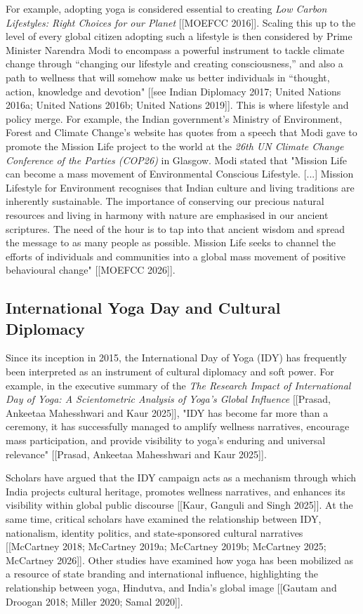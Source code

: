 \documentclass[11pt]{article}
\begin{document}
For example, adopting yoga is considered essential to creating \textit{Low Carbon Lifestyles: Right Choices for our Planet} [[MOEFCC 2016]].
Scaling this up to the level of every global citizen adopting such a lifestyle is then considered by Prime Minister Narendra Modi to encompass a powerful instrument to
tackle climate change through “changing our lifestyle and creating consciousness,” and also a path to wellness that will
somehow make us better individuals in “thought, action, knowledge and devotion" [[see Indian Diplomacy 2017; United Nations 2016a; United Nations 2016b; United Nations 2019]].
This is where lifestyle and policy merge. For example, the Indian government's Ministry of Environment, Forest and Climate Change's 
website has quotes from a speech that Modi gave to promote the Mission Life project to the world at the \textit{26th UN Climate Change 
Conference of the Parties (COP26)} in Glasgow. Modi stated that "Mission Life can become a mass movement of Environmental Conscious Lifestyle.
 [...] Mission Lifestyle for Environment recognises that Indian culture and living traditions are inherently sustainable.
The importance of conserving our precious natural resources and living in harmony with nature are emphasised in our ancient scriptures.
The need of the hour is to tap into that ancient wisdom and spread the message to as many people as possible. Mission Life 
seeks to channel the efforts of individuals and communities into a global mass movement of positive behavioural change" [[MOEFCC 2026]].



\subsection{International Yoga Day and Cultural Diplomacy}


Since its inception in 2015, the International Day of Yoga (IDY) has frequently been interpreted as an instrument of
cultural diplomacy and soft power. For example, in the executive summary of the \textit{The Research Impact of 
International Day of Yoga: A Scientometric Analysis of Yoga's Global Influence} [[Prasad, Ankeetaa Mahesshwari and Kaur 2025]], "IDY has become far more 
than a ceremony, it has successfully managed to amplify wellness narratives, encourage mass participation, 
and provide visibility to yoga’s enduring and universal relevance" [[Prasad, Ankeetaa Mahesshwari and Kaur 2025]].

Scholars have argued that the IDY campaign acts as a mechanism through which India projects cultural heritage, promotes wellness narratives, and
enhances its visibility within global public discourse [[Kaur, Ganguli and Singh 2025]]. At the same time, critical
scholars have examined the relationship between IDY, nationalism, identity politics, and state-sponsored cultural
narratives [[McCartney 2018; McCartney 2019a; McCartney 2019b; McCartney 2025; McCartney 2026]]. Other studies have examined how yoga has been mobilized as a 
resource of state branding and international influence, highlighting the relationship between yoga, Hindutva, and 
India's global image [[Gautam and Droogan 2018; Miller 2020; Samal 2020]].
\end{document}
